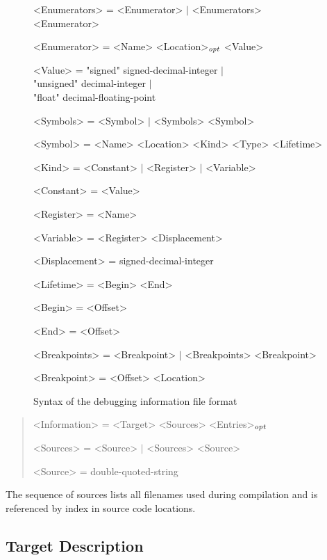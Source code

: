 \begin{figure}
\begin{minipage}{34em}
\begin{grammar}
<Enumerators> = <Enumerator> $\mid$ <Enumerators> <Enumerator> \par
<Enumerator> = <Name> <Location>$_\mathit{opt}$ <Value> \par
<Value> = "signed" signed-decimal-integer $\mid$ \\ "unsigned" decimal-integer $\mid$ \\ "float" decimal-floating-point \par
<Symbols> = <Symbol> $\mid$ <Symbols> <Symbol> \par
<Symbol> = <Name> <Location> <Kind> <Type> <Lifetime> \par
<Kind> = <Constant> $\mid$ <Register> $\mid$ <Variable> \par
<Constant> = <Value> \par
<Register> = <Name> \par
<Variable> = <Register> <Displacement> \par
<Displacement> = signed-decimal-integer \par
<Lifetime> = <Begin> <End> \par
<Begin> = <Offset> \par
<End> = <Offset> \par
<Breakpoints> = <Breakpoint> $\mid$ <Breakpoints> <Breakpoint> \par
<Breakpoint> = <Offset> <Location> \par
\end{grammar}\end{minipage}
\caption{Syntax of the debugging information file format}
\label{fig:dbgfileformat}
\end{figure}

\begin{quote}\begin{grammar}
<Information> = <Target> <Sources> <Entries>$_\mathit{opt}$ \par
<Sources> = <Source> $\mid$ <Sources> <Source> \par
<Source> = double-quoted-string \par
\end{grammar}\end{quote}

The sequence of sources lists all filenames used during compilation and is referenced by index in source code locations.

\subsection{Target Description}

